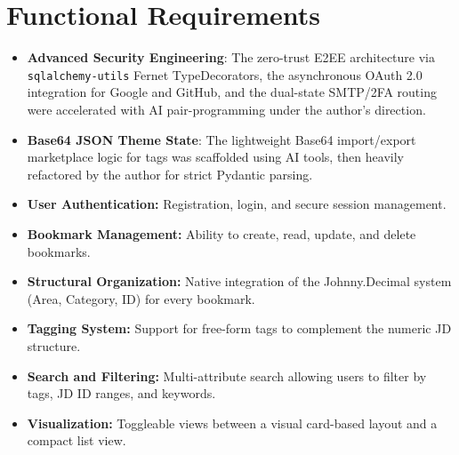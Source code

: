 \documentclass[11pt,a4paper]{book}
\begin{document}
\section{Functional Requirements}
\begin{itemize}
  \item \textbf{Advanced Security Engineering}: The zero-trust E2EE architecture via \texttt{sqlalchemy-utils} Fernet TypeDecorators, the asynchronous OAuth 2.0 integration for Google and GitHub, and the dual-state SMTP/2FA routing were accelerated with AI pair-programming under the author's direction.
  \item \textbf{Base64 JSON Theme State}: The lightweight Base64 import/export marketplace logic for tags was scaffolded using AI tools, then heavily refactored by the author for strict Pydantic parsing.

  \item \textbf{User Authentication:} Registration, login, and secure session management.
  \item \textbf{Bookmark Management:} Ability to create, read, update, and delete bookmarks.
  \item \textbf{Structural Organization:} Native integration of the Johnny.Decimal system (Area, Category, ID) for every bookmark.
  \item \textbf{Tagging System:} Support for free-form tags to complement the numeric JD structure.
  \item \textbf{Search and Filtering:} Multi-attribute search allowing users to filter by tags, JD ID ranges, and keywords.
  \item \textbf{Visualization:} Toggleable views between a visual card-based layout and a compact list view.
\end{itemize}
\end{document}
